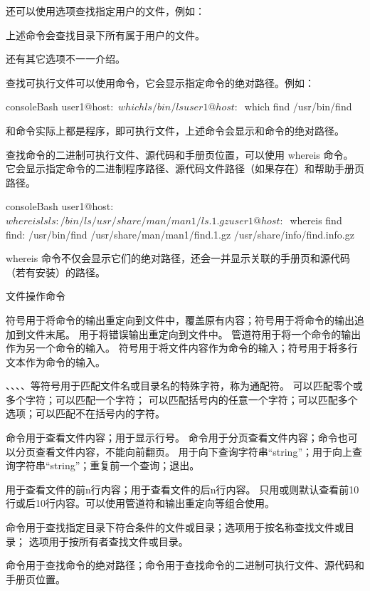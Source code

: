 还可以使用选项查找指定用户的文件，例如：
上述命令会查找目录下所有属于用户的文件。

还有其它选项不一一介绍。

查找可执行文件可以使用命令，它会显示指定命令的绝对路径。例如：
\begin{envcode}{console}{Bash}
user1@host:~$ which ls
/bin/ls
user1@host:~$ which find
/usr/bin/find
\end{envcode}
和命令实际上都是程序，即可执行文件，上述命令会显示和命令的绝对路径。

查找命令的二进制可执行文件、源代码和手册页位置，可以使用 whereis 命令。
它会显示指定命令的二进制程序路径、源代码文件路径（如果存在）和帮助手册页路径。
\begin{envcode}{console}{Bash}
user1@host:~$ whereis ls
ls: /bin/ls /usr/share/man/man1/ls.1.gz
user1@host:~$ whereis find
find: /usr/bin/find /usr/share/man/man1/find.1.gz /usr/share/info/find.info.gz
\end{envcode}
whereis 命令不仅会显示它们的绝对路径，还会一并显示关联的手册页和源代码（若有安装）的路径。

\begin{zj}
文件操作命令

\code{>}符号用于将命令的输出重定向到文件中，覆盖原有内容；\code{>>}符号用于将命令的输出追加到文件末尾。
用于将错误输出重定向到文件中。
\code{|}管道符用于将一个命令的输出作为另一个命令的输入。
\code{<}符号用于将文件内容作为命令的输入；\code{<<}符号用于将多行文本作为命令的输入。

\code{*}、、\code{[ ]}、\code{{ }}、\code{[! ]}等符号用于匹配文件名或目录名的特殊字符，称为通配符。
\code{*}可以匹配零个或多个字符；可以匹配一个字符；
\code{[ ]}可以匹配括号内的任意一个字符；\code{{ }}可以匹配多个选项；\code{[! ]}可以匹配不在括号内的字符。

命令用于查看文件内容；用于显示行号。
命令用于分页查看文件内容；命令也可以分页查看文件内容，不能向前翻页。
用于向下查询字符串“string”；用于向上查询字符串“string”；重复前一个查询；退出。

用于查看文件的前n行内容；用于查看文件的后n行内容。
只用或则默认查看前10行或后10行内容。可以使用管道符\code{|}和输出重定向等组合使用。

命令用于查找指定目录下符合条件的文件或目录；选项用于按名称查找文件或目录；
选项用于按所有者查找文件或目录。

命令用于查找命令的绝对路径；命令用于查找命令的二进制可执行文件、源代码和手册页位置。
\end{zj}


